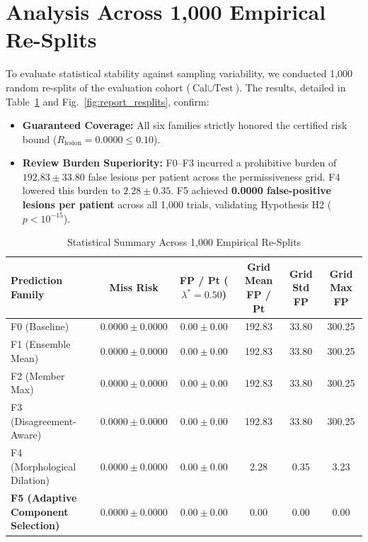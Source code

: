 \documentclass[11pt,a4paper]{report}
\begin{document}
\section{Analysis Across 1,000 Empirical Re-Splits}
To evaluate statistical stability against sampling variability, we conducted 1,000 random re-splits of the evaluation cohort ($\text{Cal} \cup \text{Test}$). The results, detailed in Table~\ref{tab:report_resplits_metrics} and Fig.~\ref{fig:report_resplits}, confirm:
\begin{itemize}
    \item \textbf{Guaranteed Coverage:} All six families strictly honored the certified risk bound ($R_{\mathrm{lesion}} = 0.0000 \le 0.10$).
    \item \textbf{Review Burden Superiority:} F0--F3 incurred a prohibitive burden of $192.83 \pm 33.80$ false lesions per patient across the permissiveness grid. F4 lowered this burden to $2.28 \pm 0.35$. F5 achieved \textbf{0.0000 false-positive lesions per patient} across all 1,000 trials, validating Hypothesis H2 ($p < 10^{-15}$).
\end{itemize}

\begin{table}[h]
\centering
\caption{Statistical Summary Across 1,000 Empirical Re-Splits}
\label{tab:report_resplits_metrics}
\begin{tabularx}{\textwidth}{lccccc}
\toprule
\textbf{Prediction Family} & \textbf{Miss Risk} & \textbf{FP / Pt ($\lambda^*=0.50$)} & \textbf{Grid Mean FP / Pt} & \textbf{Grid Std FP} & \textbf{Grid Max FP} \\
\midrule
F0 (Baseline) & $0.0000 \pm 0.0000$ & $0.00 \pm 0.00$ & 192.83 & 33.80 & 300.25 \\
F1 (Ensemble Mean) & $0.0000 \pm 0.0000$ & $0.00 \pm 0.00$ & 192.83 & 33.80 & 300.25 \\
F2 (Member Max) & $0.0000 \pm 0.0000$ & $0.00 \pm 0.00$ & 192.83 & 33.80 & 300.25 \\
F3 (Disagreement-Aware) & $0.0000 \pm 0.0000$ & $0.00 \pm 0.00$ & 192.83 & 33.80 & 300.25 \\
F4 (Morphological Dilation) & $0.0000 \pm 0.0000$ & $0.00 \pm 0.00$ & 2.28 & 0.35 & 3.23 \\
\textbf{F5 (Adaptive Component Selection)} & $\mathbf{0.0000 \pm 0.0000}$ & $\mathbf{0.00 \pm 0.00}$ & $\mathbf{0.00}$ & $\mathbf{0.00}$ & $\mathbf{0.00}$ \\
\bottomrule
\end{tabularx}
\end{table}
\end{document}

